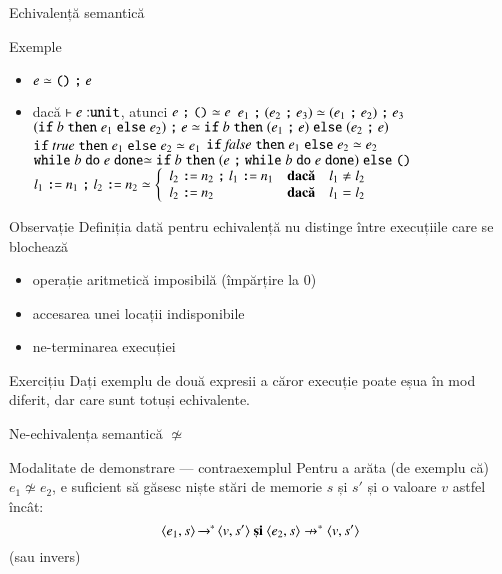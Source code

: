 \documentclass[xcolor=pdftex,romanian,colorlinks]{beamer}
\begin{document}
\begin{section}{Echivalență semantică}
\begin{frame}{}{Exemple}
\begin{itemize}
\item $e \simeq {\Sskip}\terminal{;} e$ 
\item dacă $\vdash e : \Sunit$, atunci $e\terminal{;} {\Sskip} \simeq e$
\vitem $e_1 \terminal{;} (e_2 \terminal{;} e_3) \simeq (e_1 \terminal{;} e_2) \terminal{;} e_3$ 
\vitem $({\Sif b \Sthen e_1 \Selse e_2}) \terminal{;} e  \simeq {\Sif b \Sthen (e_1 \terminal{;} e) \Selse (e_2 \terminal{;} e)}$ 
\vitem $\Sif {\Strue} \Sthen e_1 \Selse e_2 \simeq e_1$
\vitem $\Sif {\Sfalse} \Sthen e_1 \Selse e_2 \simeq e_2$
\vitem $\Swhile  b \Sdo e \Sdone \simeq {\Sif b \Sthen (e \terminal{;} {\Swhile  b \Sdo e \Sdone}) \Selse {\Sskip}}$
\vitem $l_1 \terminal{:=} n_1 \terminal{;} l_2 \terminal{:=} n_2\simeq \left\{\begin{array}{lll} l_2 \terminal{:=} n_2 \terminal{;} l_1 \terminal{:=} n_1 & \textbf{dacă} & l_1 \neq l_2
\\ l_2 \terminal{:=} n_2 & \textbf{dacă} & l_1 = l_2 \end{array}\right.$ 
\end{itemize}
\end{frame}



\begin{frame}{}
\begin{block}{Observație}
Definiția dată pentru echivalență nu distinge între execuțiile care se blochează 
\begin{itemize}
\item operație aritmetică imposibilă (împărțire la 0)
\item accesarea unei locații indisponibile
\item ne-terminarea execuției
\end{itemize}
\end{block}

\vfill
\begin{block}{Exercițiu}
Dați exemplu de două expresii a căror execuție poate eșua în mod diferit, dar care sunt totuși echivalente.
\end{block}
\end{frame}


\begin{frame}{Ne-echivalența semantică $\not\simeq$}

\begin{block}{Modalitate de demonstrare — contraexemplul}
	Pentru a arăta (de exemplu că) $e_1\not\simeq e_2$, e suficient să găsesc niște stări de memorie $s$ și $s'$ și o valoare $v$ astfel încât:
\[\Ss{\c{e_1,s}}{\!\!^\ast\,\c{v,s'}} \textbf{ și }\c{e_2,s} \not\rightarrow^\ast \c{v,s'}\]
(sau invers)
\end{block}


\end{frame}
\end{section}
\end{document}
